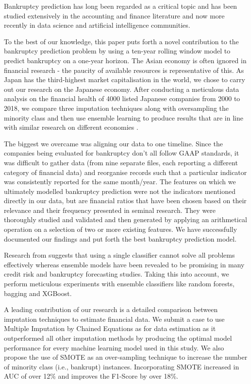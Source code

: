 \label{chap:Conclusion}

Bankruptcy prediction has long been regarded as a critical topic and has been studied extensively in the accounting and finance literature and now more recently in data science and artificial intelligence communities.

To the best of our knowledge, this paper puts forth a novel contribution to the bankruptcy prediction problem by using a ten-year rolling window model to predict bankruptcy on a one-year horizon. The Asian economy is often ignored in financial research - the paucity of available resources is representative of this. As Japan has the third-highest market capitalisation in the world, we chose to carry out our research on the Japanese economy.
After conducting a meticulous data analysis on the financial health of 4000 listed Japanese companies from 2000 to 2018, we compare three imputation techniques along with oversampling the minority class and then use ensemble learning to produce results that are in line with similar research on different economies \cite{barboza2017machine,le2018cluster}.

The biggest we overcame was aligning our data to one timeline. Since the companies being evaluated for bankruptcy don’t all follow GAAP standards, it was difficult to gather data (from nine separate files, each reporting a different category of financial data) and reorganise records such that a particular indicator was consistently reported for the same month/year.
The features on which we ultimately modelled bankruptcy prediction were not the indicators mentioned directly in our data, but are financial ratios that have been chosen based on their relevance and their frequency presented in seminal research.
They were thoroughly studied and validated and then generated by applying an arithmetical operation on a selection of two or more existing features. We have successfully documented our findings and put forth the best bankruptcy prediction model.


Research from \cite{paleologo2010subagging,brown2012experimental} suggests that using a single classifier cannot solve all problems effectively whereas ensemble models have been revealed to be promising in many credit risk and bankruptcy forecasting studies. 
Taking this into account, we perform meticulous experiments with ensemble classifiers like random forests, bagging and XGBoost. 

A leading contribution of our research is a detailed comparison between imputation techniques to estimate financial data. We submit a case to use Multiple Imputation by Chained Equations as for data estimation as it outperformed all other imputation methods by producing the optimal model performance for every machine learning model used in this study. We also propose the use of SMOTE as an over-sampling technique to increase the number of minority class (i.e., bankrupt) instances. Incorporating SMOTE increased in AUC of over 12\% and improves the F1-Score by over 18\%.

